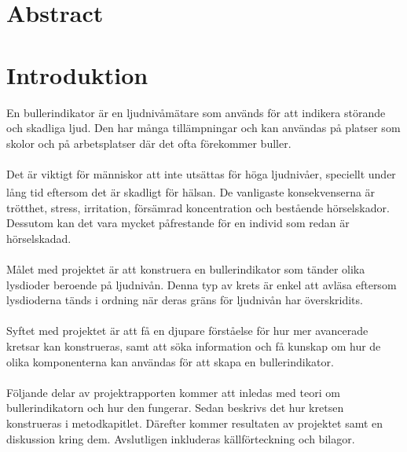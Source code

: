 \documentclass[12pt]{report}
\begin{document}
\setcounter{secnumdepth}{3}



\newpage
{}%


\chapter*{Abstract}

\newpage
\tableofcontents
\newpage

\chapter{Introduktion}
\label{chap:intro}

En bullerindikator är en ljudnivåmätare som används för att indikera störande och skadliga ljud. Den har många tillämpningar och kan användas på platser som skolor och på arbetsplatser där det ofta förekommer buller. 
\\\\
Det är viktigt för människor att inte utsättas för höga ljudnivåer, speciellt under lång tid eftersom det är skadligt för hälsan.\textsuperscript{\cite{amv}} De vanligaste konsekvenserna är trötthet, stress, irritation, försämrad koncentration och bestående hörselskador. Dessutom kan det vara mycket påfrestande för en individ som redan är hörselskadad.
\\\\
Målet med projektet är att konstruera en bullerindikator som tänder olika lysdioder beroende på ljudnivån. Denna typ av krets är enkel att avläsa eftersom lysdioderna tänds i ordning när deras gräns för ljudnivån har överskridits.  
\\\\
Syftet med projektet är att få en djupare förståelse för hur mer avancerade kretsar kan konstrueras, samt att söka information och få kunskap om hur de olika komponenterna kan användas för att skapa en bullerindikator.
\\\\
Följande delar av projektrapporten kommer att inledas med teori om bullerindikatorn och hur den fungerar. Sedan beskrivs det hur kretsen konstrueras i metodkapitlet. Därefter kommer resultaten av projektet samt en diskussion kring dem. Avslutligen inkluderas källförteckning och bilagor.
\end{document}
